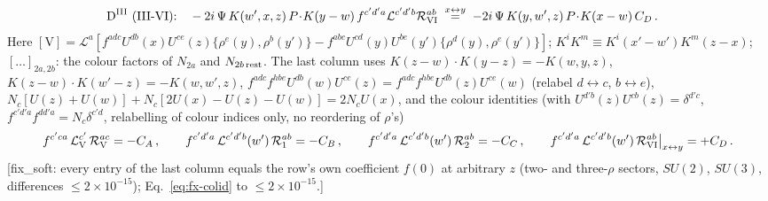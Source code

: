 {\begin{align}
\text{D}^{\rm III}\ &\text{(III-VI):}\quad-2i\,\Psi\,K(w',x,z)\,P\!\cdot\!K(y-w)\,f^{c'd'a}\mathcal{L}^{c'd'b}\mathcal{R}_{\rm VI}^{ab}\;\overset{x\leftrightarrow y}{=}\;-2i\,\Psi\,K(y,w',z)\,P\!\cdot\!K(x-w)\,C_{D}\,.\notag
\end{align}
Here $[\text{V}]=\mathcal{L}^{a}[f^{adc}U^{db}(x)U^{ce}(z)\{\rho^{e}(y),\rho^{b}(y')\}-f^{abc}U^{cd}(y)U^{be}(y')\{\rho^{d}(y),\rho^{e}(y')\}]$; $K^{i}K^{m}\equiv K^{i}(x'-w')K^{m}(z-x)$; $[\dots]_{2a,2b}$: the colour factors of $N_{2a}$ and $N_{2b\,\rm rest}$. The last column uses $K(z-w)\cdot K(y-z)=-K(w,y,z)$, $K(z-w)\cdot K(w'-z)=-K(w,w',z)$, $f^{adc}f^{hbe}U^{db}(w)U^{ce}(z)=f^{adc}f^{hbe}U^{db}(z)U^{ce}(w)$ (relabel $d\leftrightarrow c$, $b\leftrightarrow e$), $N_{c}[U(z)+U(w)]+N_{c}[2U(x)-U(z)-U(w)]=2N_{c}U(x)$, and the colour identities (with $U^{d'b}(z)U^{cb}(z)=\delta^{d'c}$, $f^{c'd'a}f^{dd'a}=N_{c}\delta^{c'd}$, relabelling of colour indices only, no reordering of $\rho$'s)
\begin{align}
f^{c'ca}\,\mathcal{L}_{\rm V}^{c'}\,\mathcal{R}_{\rm V}^{ac}=-C_{A}\,,\qquad f^{c'd'a}\,\mathcal{L}^{c'd'b}(w')\,\mathcal{R}_{1}^{ab}=-C_{B}\,,\qquad f^{c'd'a}\,\mathcal{L}^{c'd'b}(w')\,\mathcal{R}_{2}^{ab}=-C_{C}\,,\qquad f^{c'd'a}\,\mathcal{L}^{c'd'b}(w')\,\mathcal{R}_{\rm VI}^{ab}\big|_{x\leftrightarrow y}=+C_{D}\,.\label{eq:fx-colid}
\end{align}
[fix\_soft: every entry of the last column equals the row's own coefficient $f(0)$ at arbitrary $z$ (two- and three-$\rho$ sectors, $SU(2)$, $SU(3)$, differences $\le2\times10^{-15}$); Eq.~\eqref{eq:fx-colid} to $\le2\times10^{-15}$.]

}
